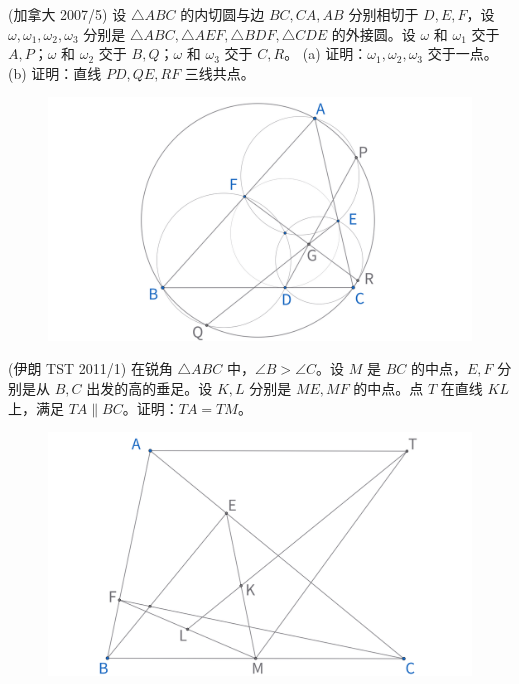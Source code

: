 \newpage 
\begin{exercise}
(加拿大 2007/5) 设 $\triangle ABC$ 的内切圆与边 $BC, CA, AB$ 分别相切于 $D, E, F$，设 $\omega, \omega_1, \omega_2, \omega_3$ 分别是 $\triangle ABC, \triangle AEF, \triangle BDF, \triangle CDE$ 的外接圆。设 $\omega$ 和 $\omega_1$ 交于 $A, P$；$\omega$ 和 $\omega_2$ 交于 $B, Q$；$\omega$ 和 $\omega_3$ 交于 $C, R$。
(a) 证明：$\omega_1, \omega_2, \omega_3$ 交于一点。
(b) 证明：直线 $PD, QE, RF$ 三线共点。
\end{exercise}
\begin{figure}[H]
    \centering
    \includegraphics[width=0.7\linewidth]{figures/exercises/237.png}
\end{figure}

\begin{exercise}
(伊朗 TST 2011/1) 在锐角 $\triangle ABC$ 中，$\angle B > \angle C$。设 $M$ 是 ${BC}$ 的中点，$E, F$ 分别是从 $B, C$ 出发的高的垂足。设 $K, L$ 分别是 $ME, MF$ 的中点。点 $T$ 在直线 $KL$ 上，满足 $TA \parallel BC$。证明：$TA = TM$。
\end{exercise}
\begin{figure}[H]
    \centering
    \includegraphics[width=0.7\linewidth]{figures/exercises/238.png}
\end{figure}